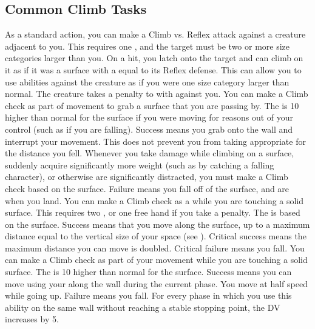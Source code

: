     \subsection{Common Climb Tasks}
         As a standard action, you can make a Climb vs. Reflex attack against a creature adjacent to you.
        This requires one , and the target must be two or more size categories larger than you.
        On a hit, you latch onto the target and can climb on it as if it was a surface with a  equal to its Reflex defense.
        This can allow you to use  abilities against the creature as if you were one size category larger than normal.
        The creature takes a  penalty to  with  against you.
         You can make a Climb check as part of movement to grab a surface that you are passing by.
        The  is 10 higher than normal for the surface if you were moving for reasons out of your control (such as if you are falling).
        Success means you grab onto the wall and interrupt your movement.
        This does not prevent you from taking  appropriate for the distance you fell.
         Whenever you take damage while climbing on a surface, suddenly acquire significantly more weight (such as by catching a falling character), or otherwise are significantly distracted, you must make a Climb check based on the surface.
        Failure means you fall off of the surface, and are \prone when you land.
         You can make a Climb check as a  while you are touching a solid surface.
        This requires two , or one free hand if you take a  penalty.
        The  is based on the surface.
        Success means that you move along the surface, up to a maximum distance equal to the vertical size of your space (see ).
        Critical success means the maximum distance you can move is doubled.
        Critical failure means you fall.
         You can make a Climb check as part of your movement while you are touching a solid surface.
        The  is 10 higher than normal for the surface.
        Success means you can move using your  along the wall during the current phase.
        You move at half speed while going up.
        Failure means you fall.
        For every phase in which you use this ability on the same wall without reaching a stable stopping point, the DV increases by 5.

